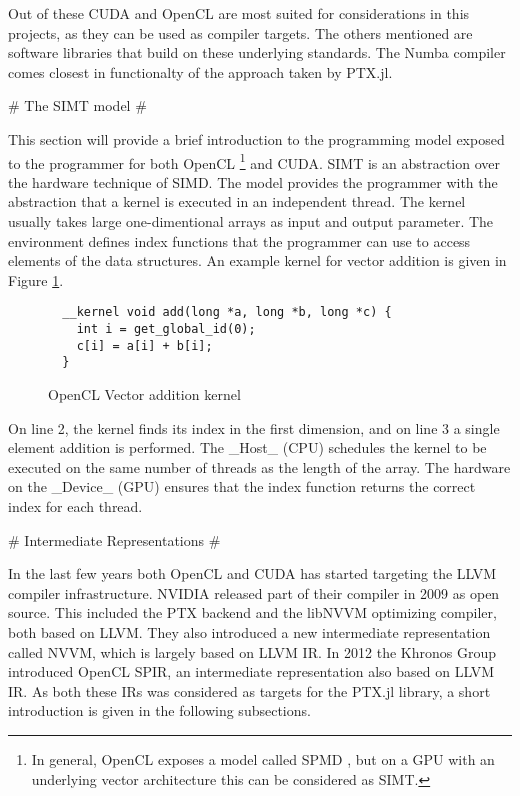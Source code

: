 \begin{markdown}
Out of these \gls{CUDA} and \gls{OpenCL} are most suited for
considerations in this projects, as they can be used as compiler
targets. The others mentioned are software libraries that build on
these underlying standards. The Numba compiler comes closest in
functionalty of the approach taken by PTX.jl.

# The SIMT model #
\label{sec:simt}

This section will provide a brief introduction to the programming
model exposed to the programmer for both OpenCL \footnote{In general,
  OpenCL exposes a model called \gls{SPMD} \cite{opencl}, but on a GPU
  with an underlying vector architecture this can be considered as
  SIMT.}  and CUDA. \gls{SIMT} is an abstraction over the hardware
technique of \gls{SIMD}. The model provides the programmer with the
abstraction that a kernel is executed in an independent thread. The
kernel usually takes large one-dimentional arrays as input and output
parameter. The environment defines index functions that the programmer
can use to access elements of the data structures. An example kernel
for vector addition is given in Figure \ref{smit:add}.

\begin{figure}[H]
  \begin{verbatim}
  __kernel void add(long *a, long *b, long *c) {
    int i = get_global_id(0);
    c[i] = a[i] + b[i];
  }
  \end{verbatim}
  \caption{OpenCL Vector addition kernel}
  \label{smit:add}
\end{figure}

On line 2, the kernel finds its index in the first dimension, and on
line 3 a single element addition is performed. The _Host_ (\gls{CPU})
schedules the kernel to be executed on the same number of threads as
the length of the array. The hardware on the _Device_ (\gls{GPU})
ensures that the index function returns the correct index for each
thread.

# Intermediate Representations #

In the last few years both \gls{OpenCL} and \gls{CUDA} has started
targeting the \gls{LLVM} compiler infrastructure. NVIDIA released part
of their compiler in 2009 as open source. This included the \gls{PTX}
backend \cite{nvptx} and the libNVVM \cite{libnvvm} optimizing
compiler, both based on \gls{LLVM}. They also introduced a new
intermediate representation called NVVM, which is largely based on
\gls{LLVM} \gls{IR}. In 2012 the Khronos Group introduced \gls{OpenCL}
\gls{SPIR}, an intermediate representation also based on \gls{LLVM}
\gls{IR}. As both these \glspl{IR} was considered as targets for the
PTX.jl library, a short introduction is given in the following
subsections.


\end{markdown}
